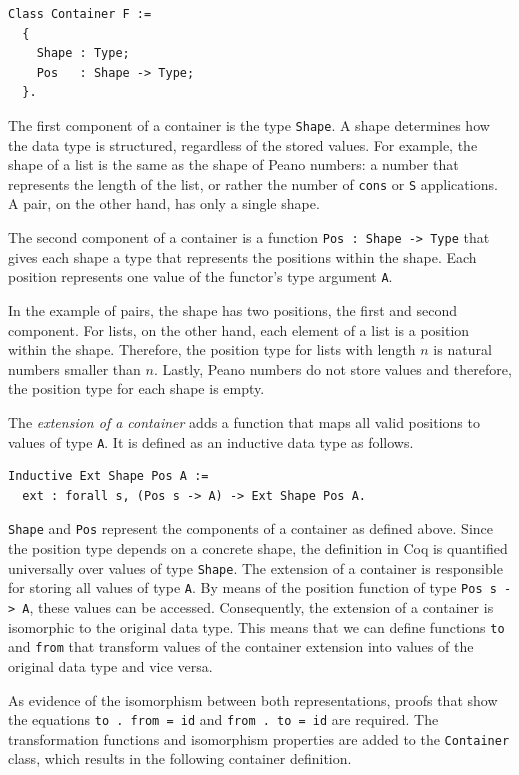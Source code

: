 \documentclass[a4paper, 11pt, fleqn, twoside, abstract=on]{scrreprt}
\newcommand{\hinl}[1]{\texttt{#1}}
\newcommand{\cinl}[1]{\texttt{#1}}
\begin{document}
\begin{verbatim}
Class Container F :=
  {
    Shape : Type;
    Pos   : Shape -> Type;
  }.
\end{verbatim}
\noindent
The first component of a container is the type \texttt{Shape}.
A shape determines how the data type is structured, regardless of the stored values.
For example, the  shape of a list is the same as the shape of Peano numbers: a number that  represents the length of the list, or rather the number of \cinl{cons} or \cinl{S} applications.
A pair, on the other hand, has only a single shape.

The second component of a container is a function \cinl{Pos : Shape -> Type} that gives each shape a type that represents the positions within the shape.
Each position represents one value of the functor's type argument \hinl{A}.

In the example of pairs, the shape has two positions, the first and second component.
For lists, on the other hand, each element of a list is a position within the shape.
Therefore, the position type for lists with length $n$ is natural numbers smaller than $n$.
Lastly, Peano numbers do not store values and therefore, the position type for each shape is empty.

The \textit{extension of a container} adds a function that maps all valid positions to values of type \cinl{A}.
It is defined as an inductive data type as follows.

\begin{verbatim}
Inductive Ext Shape Pos A := 
  ext : forall s, (Pos s -> A) -> Ext Shape Pos A.
\end{verbatim}
\noindent
\cinl{Shape} and \cinl{Pos} represent the components of a container as defined above.
Since the position type depends on a concrete shape, the definition in Coq is quantified universally over values of type \cinl{Shape}.
The extension of a container is responsible for storing all values of type \cinl{A}.
By means of the position function of type \cinl{Pos s -> A}, these values can be accessed.
Consequently, the extension of a container is isomorphic to the original data type.
This means that we can define functions \cinl{to} and \cinl{from} that transform values of the container extension into values of the original data type and vice versa.

As evidence of the isomorphism between both representations, proofs that show the equations \cinl{to . from = id} and \hinl{from . to = id} are required.
The transformation functions and isomorphism properties are added to the \cinl{Container} class, which results in the following container definition.
\end{document}
